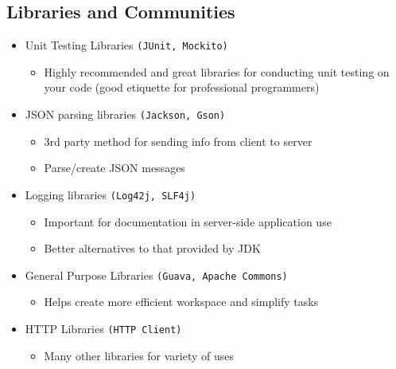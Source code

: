 \subsection{Libraries and Communities}
\begin{itemize}
	\item Unit Testing Libraries \texttt{(JUnit, Mockito)}
	\begin{itemize}
		\item Highly recommended and great libraries for conducting unit testing on your code (good etiquette for professional programmers)
	\end{itemize}
	
	
	\item  JSON parsing libraries \texttt{(Jackson, Gson)}
	\begin{itemize}
		\item 3rd party method for sending info from client to server
		\item Parse/create JSON messages
	\end{itemize}

	\item  Logging libraries \texttt{(Log42j, SLF4j)}
	\begin{itemize}
		\item Important for documentation in server-side application use
		\item Better alternatives to that provided by JDK
	\end{itemize}
	
	\item General Purpose Libraries \texttt{(Guava, Apache Commons)}
	\begin{itemize}
		\item Helps create more efficient workspace and simplify tasks
	\end{itemize}
	
	\item HTTP Libraries \texttt{(HTTP Client)}
	\begin{itemize}
		\item Many other libraries for variety of uses 
	\end{itemize}
\end{itemize}
